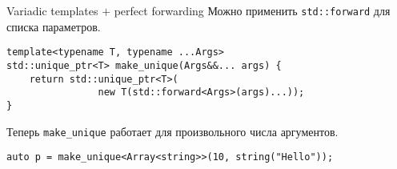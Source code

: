 \documentclass{beamer}
\begin{document}
\begin{frame}[fragile]{Variadic templates $+$ perfect forwarding}
Можно применить \texttt{std::forward} для списка параметров.
\begin{lstlisting}
template<typename T, typename ...Args> 
std::unique_ptr<T> make_unique(Args&&... args) {
    return std::unique_ptr<T>(
                new T(std::forward<Args>(args)...));
}
\end{lstlisting}
Теперь \texttt{make\_unique} работает для произвольного числа аргументов.
\begin{lstlisting}
auto p = make_unique<Array<string>>(10, string("Hello"));
\end{lstlisting}
\end{frame}
\end{document}
